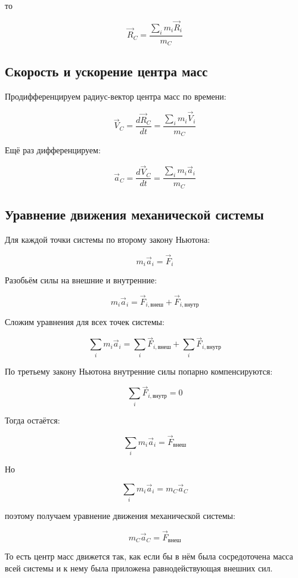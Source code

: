 \documentclass[a4paper,12pt]{article}
\begin{document}
то

\[
\vec R_C
=
\frac{\sum_i m_i \vec R_i}{m_C}
\]

\vspace{0.8em}

\subsection*{Скорость и ускорение центра масс}

Продифференцируем радиус-вектор центра масс по времени:

\[
\vec V_C
=
\frac{d\vec R_C}{dt}
=
\frac{\sum_i m_i \vec V_i}{m_C}
\]

Ещё раз дифференцируем:

\[
\vec a_C
=
\frac{d\vec V_C}{dt}
=
\frac{\sum_i m_i \vec a_i}{m_C}
\]

\vspace{0.8em}

\subsection*{Уравнение движения механической системы}

Для каждой точки системы по второму закону Ньютона:

\[
m_i \vec a_i = \vec F_i
\]

Разобьём силы на внешние и внутренние:

\[
m_i \vec a_i
=
\vec F_{i,\text{внеш}} + \vec F_{i,\text{внутр}}
\]

Сложим уравнения для всех точек системы:

\[
\sum_i m_i \vec a_i
=
\sum_i \vec F_{i,\text{внеш}}
+
\sum_i \vec F_{i,\text{внутр}}
\]

По третьему закону Ньютона внутренние силы попарно компенсируются:

\[
\sum_i \vec F_{i,\text{внутр}} = 0
\]

Тогда остаётся:

\[
\sum_i m_i \vec a_i
=
\vec F_{\text{внеш}}
\]

Но

\[
\sum_i m_i \vec a_i
=
m_C \vec a_C
\]

поэтому получаем уравнение движения механической системы:

\[
m_C \vec a_C
=
\vec F_{\text{внеш}}
\]
 

То есть центр масс движется так, как если бы в нём была сосредоточена масса всей системы и к нему была приложена равнодействующая внешних сил.
\end{document}
